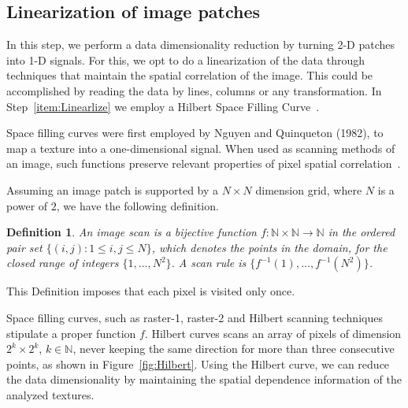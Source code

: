 \documentclass{isprs}
\begin{document}
\subsection{Linearization of image patches}\label{linearization}

In this step, we perform a data dimensionality reduction by turning 2-D patches into 1-D signals.
For this, we opt to do a linearization of the data through techniques that maintain the spatial correlation of the image.
This could be accomplished by reading the data by lines, columns or any transformation.
In Step~\ref{item:Linearlize} we employ a Hilbert Space Filling Curve~\cite{Lee1994Texture}.

Space filling curves were first employed by Nguyen and Quinqueton (1982), to map a texture into a one-dimensional signal.
When used as scanning methods of an image, such functions preserve relevant properties of pixel spatial correlation~\cite{Lee1994Texture}.

Assuming an image patch is supported by a $N \times N$ dimension grid, where $N$ is a power of $2$, we have the following definition.

\newtheorem{mydef}{Definition}
\begin{mydef}
	An image scan is a bijective function $f \colon \mathbb{N} \times \mathbb{N} \to \mathbb{N}$ in the ordered pair set $ \{(i, j): 1 \leq i , j \leq N \}$, which denotes the points in the domain, for the closed range of integers $\{1, \dots, N^2\}$.
	A scan rule is $\{f^{-1}(1), \dots, f^{-1}(N^2)\}$.
	\label{def:CurveFilling}
\end{mydef}
This Definition imposes that each pixel is visited only once.

Space filling curves, such as raster-1, raster-2 and Hilbert scanning techniques stipulate a proper function $f$.
Hilbert curves scans an array of pixels of dimension $2^k \times 2^k$, $k \in \mathbb{N}$, never keeping the same direction for more than three consecutive points, as shown in Figure~\ref{fig:Hilbert}.
Using the Hilbert curve, we can reduce the data dimensionality by maintaining the spatial dependence information of the analyzed textures.
\end{document}
